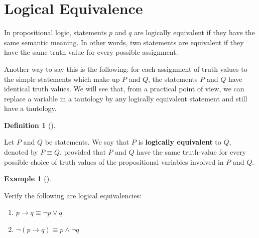 \documentclass[
  letterpaper,
  10pt,
  reqno,
  twopage,
  openany]{book}
\providecommand{\tightlist}{%
  \setlength{\itemsep}{0pt}\setlength{\parskip}{0pt}}\usepackage{longtable,booktabs,array}
\theoremstyle{plain}
\theoremstyle{definition}
\theoremstyle{definition}
\newtheorem{definition}{Definition}[chapter]
\theoremstyle{definition}
\newtheorem{example}{Example}[chapter]
\theoremstyle{plain}
\theoremstyle{plain}
\theoremstyle{remark}
\begin{document}
\hypertarget{logical-equivalence}{%
\section{Logical Equivalence}\label{logical-equivalence}}

In propositional logic, statements \(p\) and \(q\) are logically
equivalent if they have the same semantic meaning. In other words, two
statements are equivalent if they have the same truth value for every
possible assignment.

Another way to say this is the following: for each assignment of truth
values to the simple statements which make up \(P\) and \(Q\), the
statements \(P\) and \(Q\) have identical truth values. We will see
that, from a practical point of view, we can replace a variable in a
tautology by any logically equivalent statement and still have a
tautology.

\leavevmode{}%
\begin{definition}[]\label{def-equiv}

Let \(P\) and \(Q\) be statements. We say that \(P\) is
 \textbf{logically equivalent} to \(Q\),
denoted by \(P\equiv Q\), provided that \(P\) and \(Q\) have the same
truth-value for every possible choice of truth values of the
propositional variables involved in \(P\) and \(Q\).

\end{definition}

\leavevmode{}%
\begin{example}[]\label{exm-ex4}

Verify the following are logical equivalencies:

\begin{enumerate}
\def\labelenumi{\arabic{enumi}.}
\tightlist
\item
  \(p\rightarrow q \equiv \neg p \lor q\)
\item
  \(\neg (p\rightarrow q) \equiv p\land \neg q\)
\end{enumerate}

\end{example}
\end{document}
